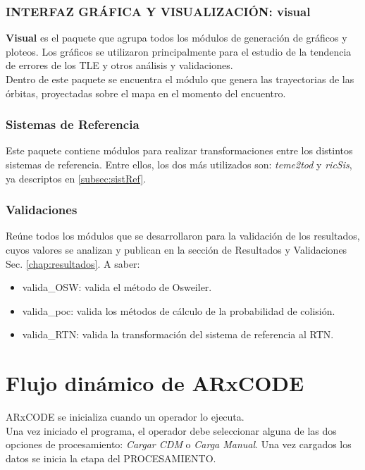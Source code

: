 \subsubsection*{INTERFAZ GR\'AFICA Y VISUALIZACI\'ON: visual}
{\bf{Visual}} es el paquete que agrupa todos los m\'odulos de generaci\'on de gr\'aficos y ploteos. Los gr\'aficos se utilizaron principalmente para el estudio de la tendencia de errores de los TLE y otros an\'alisis y validaciones.\\
Dentro de este paquete se encuentra el m\'odulo que genera las trayectorias de las \'orbitas, proyectadas sobre el mapa en el momento del encuentro.\\

\subsubsection*{Sistemas de Referencia}
Este paquete contiene m\'odulos para realizar transformaciones entre los distintos sistemas de referencia. Entre ellos, los dos m\'as utilizados son:
{\it{teme2tod}} y {\it{ricSis}}, ya descriptos en \ref{subsec:sistRef}.

\subsubsection*{Validaciones}
Re\'une todos los m\'odulos que se desarrollaron para la validaci\'on de los resultados, cuyos valores se analizan y publican en la secci\'on de Resultados y Validaciones Sec. \ref{chap:resultados}. A saber:

\begin{itemize}
 \item valida\_OSW: valida el m\'etodo de Osweiler.
 \item valida\_poc: valida los m\'etodos de c\'alculo de la probabilidad de colisi\'on.
 \item valida\_RTN: valida la transformaci\'on del sistema de referencia al RTN.
\end{itemize}


\section{Flujo din\'amico de ARxCODE}

ARxCODE se inicializa cuando un operador lo ejecuta.\\
Una vez iniciado el programa, el operador debe seleccionar alguna de las dos opciones de procesamiento: {\it{Cargar CDM}} o {\it{Carga Manual}}. Una vez cargados los datos se inicia la etapa del PROCESAMIENTO.\\

